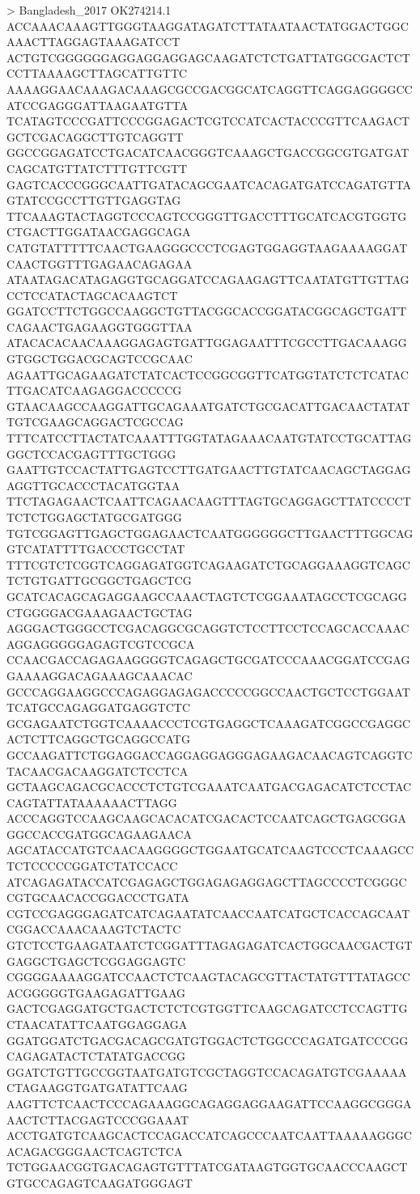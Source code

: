 > Bangladesh_2017 OK274214.1 
ACCAAACAAAGTTGGGTAAGGATAGATCTTATAATAACTATGGACTGGCAAACTTAGGAGTAAAGATCCT
ACTGTCGGGGGGAGGAGGAGGAGCAAGATCTCTGATTATGGCGACTCTCCTTAAAAGCTTAGCATTGTTC
AAAAGGAACAAAGACAAAGCGCCGACGGCATCAGGTTCAGGAGGGGCCATCCGAGGGATTAAGAATGTTA
TCATAGTCCCGATTCCCGGAGACTCGTCCATCACTACCCGTTCAAGACTGCTCGACAGGCTTGTCAGGTT
GGCCGGAGATCCTGACATCAACGGGTCAAAGCTGACCGGCGTGATGATCAGCATGTTATCTTTGTTCGTT
GAGTCACCCGGGCAATTGATACAGCGAATCACAGATGATCCAGATGTTAGTATCCGCCTTGTTGAGGTAG
TTCAAAGTACTAGGTCCCAGTCCGGGTTGACCTTTGCATCACGTGGTGCTGACTTGGATAACGAGGCAGA
CATGTATTTTTCAACTGAAGGGCCCTCGAGTGGAGGTAAGAAAAGGATCAACTGGTTTGAGAACAGAGAA
ATAATAGACATAGAGGTGCAGGATCCAGAAGAGTTCAATATGTTGTTAGCCTCCATACTAGCACAAGTCT
GGATCCTTCTGGCCAAGGCTGTTACGGCACCGGATACGGCAGCTGATTCAGAACTGAGAAGGTGGGTTAA
ATACACACAACAAAGGAGAGTGATTGGAGAATTTCGCCTTGACAAAGGGTGGCTGGACGCAGTCCGCAAC
AGAATTGCAGAAGATCTATCACTCCGGCGGTTCATGGTATCTCTCATACTTGACATCAAGAGGACCCCCG
GTAACAAGCCAAGGATTGCAGAAATGATCTGCGACATTGACAACTATATTGTCGAAGCAGGACTCGCCAG
TTTCATCCTTACTATCAAATTTGGTATAGAAACAATGTATCCTGCATTAGGGCTCCACGAGTTTGCTGGG
GAATTGTCCACTATTGAGTCCTTGATGAACTTGTATCAACAGCTAGGAGAGGTTGCACCCTACATGGTAA
TTCTAGAGAACTCAATTCAGAACAAGTTTAGTGCAGGAGCTTATCCCCTTCTCTGGAGCTATGCGATGGG
TGTCGGAGTTGAGCTGGAGAACTCAATGGGGGGCTTGAACTTTGGCAGGTCATATTTTGACCCTGCCTAT
TTTCGTCTCGGTCAGGAGATGGTCAGAAGATCTGCAGGAAAGGTCAGCTCTGTGATTGCGGCTGAGCTCG
GCATCACAGCAGAGGAAGCCAAACTAGTCTCGGAAATAGCCTCGCAGGCTGGGGACGAAAGAACTGCTAG
AGGGACTGGGCCTCGACAGGCGCAGGTCTCCTTCCTCCAGCACCAAACAGGAGGGGGAGAGTCGTCCGCA
CCAACGACCAGAGAAGGGGTCAGAGCTGCGATCCCAAACGGATCCGAGGAAAAGGACAGAAAGCAAACAC
GCCCAGGAAGGCCCAGAGGAGAGACCCCCGGCCAACTGCTCCTGGAATTCATGCCAGAGGATGAGGTCTC
GCGAGAATCTGGTCAAAACCCTCGTGAGGCTCAAAGATCGGCCGAGGCACTCTTCAGGCTGCAGGCCATG
GCCAAGATTCTGGAGGACCAGGAGGAGGGAGAAGACAACAGTCAGGTCTACAACGACAAGGATCTCCTCA
GCTAAGCAGACGCACCCTCTGTCGAAATCAATGACGAGACATCTCCTACCAGTATTATAAAAAACTTAGG
ACCCAGGTCCAAGCAAGCACACATCGACACTCCAATCAGCTGAGCGGAGGCCACCGATGGCAGAAGAACA
AGCATACCATGTCAACAAGGGGCTGGAATGCATCAAGTCCCTCAAAGCCTCTCCCCCGGATCTATCCACC
ATCAGAGATACCATCGAGAGCTGGAGAGAGGAGCTTAGCCCCTCGGGCCGTGCAACACCGGACCCTGATA
CGTCCGAGGGAGATCATCAGAATATCAACCAATCATGCTCACCAGCAATCGGACCAAACAAAGTCTACTC
GTCTCCTGAAGATAATCTCGGATTTAGAGAGATCACTGGCAACGACTGTGAGGCTGAGCTCGGAGGAGTC
CGGGGAAAAGGATCCAACTCTCAAGTACAGCGTTACTATGTTTATAGCCACGGGGGTGAAGAGATTGAAG
GACTCGAGGATGCTGACTCTCTCGTGGTTCAAGCAGATCCTCCAGTTGCTAACATATTCAATGGAGGAGA
GGATGGATCTGACGACAGCGATGTGGACTCTGGCCCAGATGATCCCGGCAGAGATACTCTATATGACCGG
GGATCTGTTGCCGGTAATGATGTCGCTAGGTCCACAGATGTCGAAAAACTAGAAGGTGATGATATTCAAG
AAGTTCTCAACTCCCAGAAAGGCAGAGGAGGAAGATTCCAAGGCGGGAAACTCTTACGAGTCCCGGAAAT
ACCTGATGTCAAGCACTCCAGACCATCAGCCCAATCAATTAAAAAGGGCACAGACGGGAACTCAGTCTCA
TCTGGAACGGTGACAGAGTGTTTATCGATAAGTGGTGCAACCCAAGCTGTGCCAGAGTCAAGATGGGAGT
